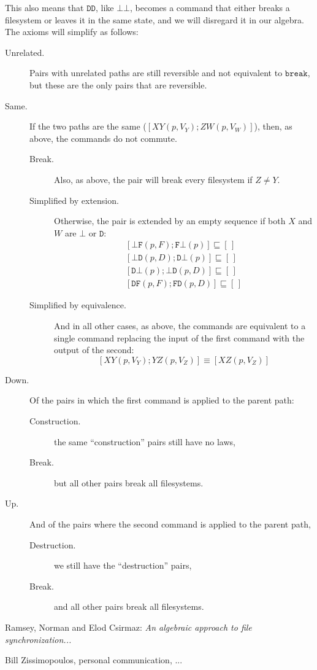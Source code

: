 \documentclass[12pt]{article}
\newcommand{\empt}{\bot}
\newcommand{\cbrk}{\mathtt{break}}
\newcommand{\fscommand}[2]{{#1#2}}
\newcommand{\fsregcommandchar}[1]{\mathtt{#1}}
\newcommand{\fsregcommand}[2]{\fscommand{\fsregcommandchar{#1}}{\fsregcommandchar{#2}}}
\newcommand{\cbb}{\fsregcommand{\empt}{\empt}}
\newcommand{\cbf}{\fsregcommand{\empt}{F}}
\newcommand{\cbd}{\fsregcommand{\empt}{D}}
\newcommand{\cfb}{\fsregcommand{F}{\empt}}
\newcommand{\cfd}{\fsregcommand{F}{D}}
\newcommand{\cdb}{\fsregcommand{D}{\empt}}
\newcommand{\cdf}{\fsregcommand{D}{F}}
\newcommand{\cdd}{\fsregcommand{D}{D}}
\newcommand{\cxy}{\fscommand{X}{Y}}
\newcommand{\cyz}{\fscommand{Y}{Z}}
\newcommand{\cxz}{\fscommand{X}{Z}}
\newcommand{\czw}{\fscommand{Z}{W}}
\newcommand{\eqext}{\sqsubseteq}
\newcommand{\emptyseq}{[\,]}
\begin{document}
This also means that $\cdd$, like $\cbb$, becomes a command that either breaks a filesystem
or leaves it in the same state, and we will disregard it in our algebra.
The axioms will simplify as follows:

\begin{description}
\item[Unrelated.] Pairs with unrelated paths are still reversible and not equivalent to
$\cbrk$, but these are the only pairs that are reversible.
%
\item[Same.] If the two paths are the same ($[\cxy(p,V_Y); \czw(p,V_W)]$), then,
as above, the commands do not commute.
   \begin{description}
   \item[Break.] Also, as above, the pair will break every filesystem if $Z\ne Y$.
   \item[Simplified by extension.] Otherwise, the pair is extended by an empty sequence
   if both $X$ and $W$ are $\fsregcommandchar{\empt}$ or $\fsregcommandchar{D}$:
   \begin{gather*}
            [\cbf(p, F); \cfb(p)] \eqext \emptyseq \\
            [\cbd(p, D); \cdb(p)] \eqext \emptyseq \\
            [\cdb(p); \cbd(p, D)] \eqext \emptyseq \\
            [\cdf(p, F); \cfd(p, D)] \eqext \emptyseq
   \end{gather*}
   \item[Simplified by equivalence.]
   And in all other cases, as above, the commands are equivalent to a single command
   replacing the input of the first command with the output of the second:
   \[ [\cxy(p, V_Y); \cyz(p, V_Z)] \equiv [\cxz(p, V_Z)] \]
   \end{description}
%
\item[Down.]
Of the pairs in which the first command is applied to the parent path:
   \begin{description}
   \item[Construction.] the same ``construction'' pairs still have no laws, 
   \item[Break.] but all other pairs break all filesystems.
   \end{description}
%
\item[Up.]
And of the pairs where the second command
is applied to the parent path,
   \begin{description}
   \item[Destruction.] we still have the ``destruction'' pairs,
   \item[Break.] and all other pairs break all filesystems.
   \end{description}
\end{description}


\begin{thebibliography}{99}

 Ramsey, Norman and Elod Csirmaz: {\it An algebraic approach to
file synchronization...}

 Bill Zissimopoulos, personal communication, ...

\end{thebibliography}
\end{document}
